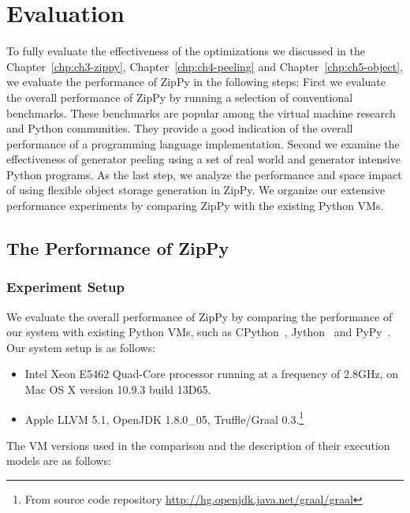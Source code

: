 \chapter{Evaluation}
\label{chp:ch5-evaluation}

To fully evaluate the effectiveness of the optimizations we discussed in the Chapter~\ref{chp:ch3-zippy}, Chapter~\ref{chp:ch4-peeling} and Chapter~\ref{chp:ch5-object}, we evaluate the performance of ZipPy in the following steps:
First we evaluate the overall performance of ZipPy by running a selection of conventional benchmarks.
These benchmarks are popular among the virtual machine research and Python communities.
They provide a good indication of the overall performance of a programming language implementation.
Second we examine the effectiveness of generator peeling using a set of real world and generator intensive Python programs.
As the last step, we analyze the performance and space impact of using flexible object storage generation in ZipPy.
We organize our extensive performance experiments by comparing ZipPy with the existing Python VMs.

\section{The Performance of ZipPy}
\label{sec:ch6-performance-of-zippy}

\subsection{Experiment Setup}

We evaluate the overall performance of ZipPy by comparing the performance of our system with existing Python VMs, such as CPython~\cite{python}, Jython~\cite{jython} and PyPy~\cite{pypy}.
Our system setup is as follows:

\begin{itemize}

\item Intel Xeon E5462 Quad-Core processor running at a frequency of 2.8GHz, on Mac OS X version 10.9.3 build 13D65.

\item Apple LLVM 5.1, OpenJDK 1.8.0\_05, Truffle/Graal 0.3.\footnote{From source code repository \url{http://hg.openjdk.java.net/graal/graal}}

\end{itemize}

The VM versions used in the comparison and the description of their execution models are as follows:

